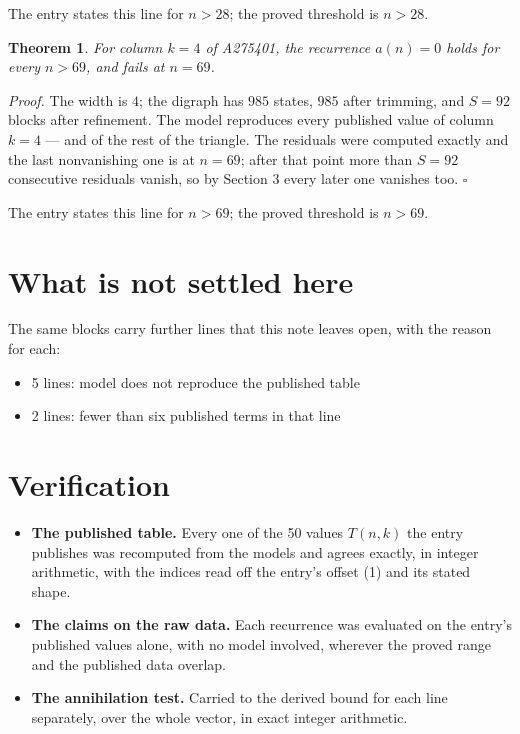 \documentclass[11pt]{article}
\newtheorem{theorem}{Theorem}
\theoremstyle{definition}
\begin{document}
The entry states this line for $n > 28$; the proved threshold is $n > 28$.

\begin{theorem} For column $k = 4$ of A275401, the recurrence $a(n) = 0$ holds for every $n > 69$, and fails at $n = 69$.\end{theorem}

{\itshape Proof.} The width is $4$; the digraph has $985$ states, $985$ after trimming, and $S = 92$ blocks after refinement. The model reproduces every published value of column $k = 4$ --- and of the rest of the triangle. The residuals were computed exactly and the last nonvanishing one is at $n = 69$; after that point more than $S = 92$ consecutive residuals vanish, so by Section 3 every later one vanishes too. $\square$

The entry states this line for $n > 69$; the proved threshold is $n > 69$.

\section{What is not settled here}

The same blocks carry further lines that this note leaves open, with the reason for each:

\begin{itemize}

\item 5 lines: model does not reproduce the published table

\item 2 lines: fewer than six published terms in that line

\end{itemize}

\section{Verification}

\begin{itemize}

\item {\bfseries The published table.} Every one of the 50 values $T(n,k)$ the entry publishes was recomputed from the models and agrees exactly, in integer arithmetic, with the indices read off the entry's offset (1) and its stated shape.

\item {\bfseries The claims on the raw data.} Each recurrence was evaluated on the entry's published values alone, with no model involved, wherever the proved range and the published data overlap.

\item {\bfseries The annihilation test.} Carried to the derived bound for each line separately, over the whole vector, in exact integer arithmetic.

\end{itemize}
\end{document}
